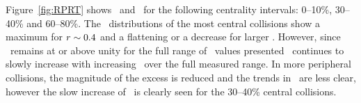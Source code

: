 Figure~\ref{fig:RPRT} shows \RTheta\ and \RP\ for the following centrality intervals: 0--10\%, 30--40\% and 60--80\%.  The \RTheta\ 
distributions of the most central collisions show a maximum for $\mbox{$r$} \sim 0.4$ and a flattening or a decrease for larger \rvar.
However, since \RTheta\ remains at or above unity for the full range of \rvar\ values presented \RP\ continues
to slowly increase with increasing \rvar\ over the full measured range.  In more peripheral collisions,
the magnitude of the excess is reduced and the trends in \RTheta\ are less clear, however the slow increase
of \RP\ is clearly seen for the 30--40\% central collisions.




\FloatBarrier
